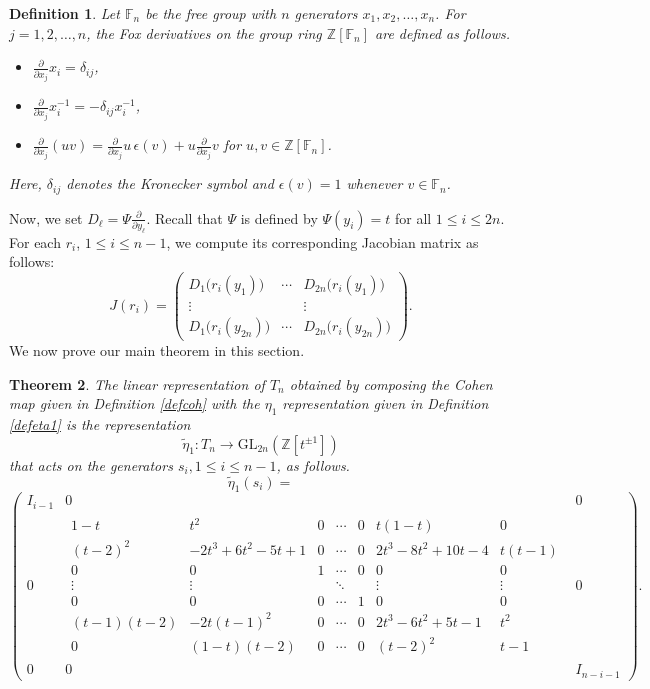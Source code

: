 \documentclass[reqno]{amsart}
\newtheorem{theorem}{Theorem}
\newtheorem{definition}[theorem]{Definition}
\begin{document}
\begin{definition}
Let $\mathbb{F}_n$ be the free group with $n$ generators 
$x_1, x_2, \ldots, x_n$. For $j=1,2,\ldots,n$, the Fox derivatives on the group ring $\mathbb{Z}[\mathbb{F}_n]$ are defined as follows.
\begin{itemize}
\item[(1)] $\displaystyle \frac{\partial}{\partial x_j}x_i=\delta_{ij}$,
\item[(2)] $\displaystyle \frac{\partial }{\partial x_j}x_i^{-1}=-\delta_{ij}x_i^{-1}$,
\item[(3)] $\displaystyle \frac{\partial}{\partial x_j}(uv)=\frac{\partial }{\partial x_j}u\,\epsilon(v)+u\frac{\partial }{\partial x_j}v$ for $u,v\in \mathbb{Z}[\mathbb{F}_n]$.
\end{itemize}
Here, $\delta_{ij}$ denotes the Kronecker symbol and $\epsilon(v)=1$ whenever $v\in \mathbb{F}_n$.
\end{definition}

Now, we set $D_\ell=\Psi \displaystyle \frac{\partial}{\partial y_\ell}$. Recall that $\Psi$ is defined by $\Psi(y_i)=t$ for all $1\leq i \leq 2n$. For each $r_i$, $1\leq i \leq n-1$, we compute its corresponding Jacobian matrix as follows:
\[
J(r_i)=
\begin{pmatrix}
D_1\big(r_i(y_1)\big) & \cdots & D_{2n}\big(r_i(y_1)\big) \\
\vdots & & \vdots \\
D_1\big(r_i(y_{2n})\big) & \cdots & D_{2n}\big(r_i(y_{2n})\big)
\end{pmatrix}.
\]
We now prove our main theorem in this section.

\begin{theorem} \label{Th1st}
The linear representation of $T_n$ obtained by composing the Cohen map given in Definition \ref{defcoh} with the $\eta_1$ representation given in Definition \ref{defeta1} is the representation 
$$\widetilde{\eta}_1:T_n \longrightarrow \mathrm{GL}_{2n}(\mathbb{Z}[t^{\pm1}])$$ that acts on the generators $s_i, 1\leq i \leq n-1$, as follows.
$$\widetilde{\eta}_1(s_i)=$$
{\small
\[
\left(
\begin{array}{c|c|c}
I_{i-1} & 0 & 0 \\
\hline
0 &
\begin{matrix}
1-t & t^2 & 0 & \cdots & 0 & t(1-t) & 0\\
(t-2)^2 & -2t^3+6t^2-5t+1 & 0 & \cdots & 0 & 2t^3-8t^2+10t-4 & t(t-1)\\
0 & 0 & 1 & \cdots & 0 & 0 & 0\\
\vdots & \vdots & & \ddots & & \vdots & \vdots\\
0 & 0 & 0 & \cdots & 1 & 0 & 0\\
(t-1)(t-2) & -2t(t-1)^2 & 0 & \cdots & 0 & 2t^3-6t^2+5t-1 & t^2\\
0 & (1-t)(t-2) & 0 & \cdots & 0 & (t-2)^2 & t-1
\end{matrix}
& 0 \\
\hline
0 & 0 & I_{n-i-1}
\end{array}
\right).
\]
}
\end{theorem} 
\end{document}
